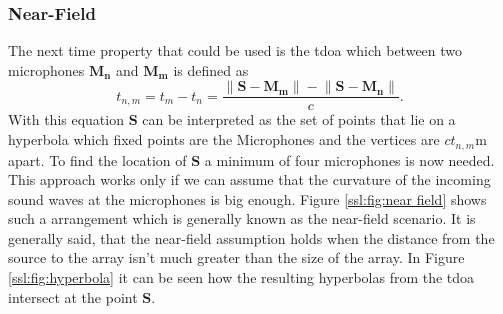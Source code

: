 \subsubsection{Near-Field}
The next time property that could be used is the \acrfull{tdoa} which between 
two microphones $\bm{M_n}$ and $\bm{M_m}$ is defined as 
\begin{equation}
  t_{n, m} = t_m - t_n = \frac{\lVert \bm{S} - \bm{M_m}\rVert - \lVert \bm{S} - \bm{M_n}\rVert}{c}.
\end{equation}
With this equation $\bm{S}$ can be interpreted as the set of points that lie on a hyperbola
which fixed points are the Microphones and the vertices are $c t_{n,m}$m apart.
To find the location of $\bm{S}$ a minimum of four microphones is now needed.
This approach works only if we can assume that the curvature of the incoming sound waves
at the microphones is big enough. Figure \ref{ssl:fig:near field} shows such a arrangement
which is generally known as the near-field scenario. 
It is generally said, that the near-field assumption holds when the distance from the source
to the array isn't much greater than the size of the array.
In Figure \ref{ssl:fig:hyperbola} it can be seen how the resulting hyperbolas from the 
\acrshort{tdoa} intersect at the point $\bm{S}$.


